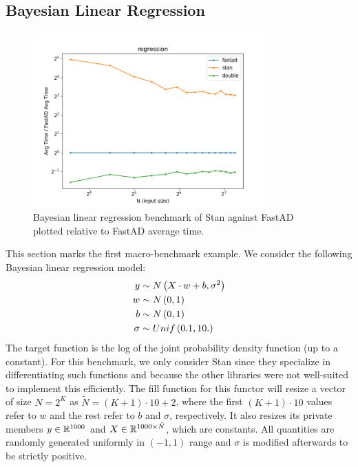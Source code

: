\subsection{Bayesian Linear Regression}\label{ssec:regression}

\begin{figure}[t]
    \centering
    \includegraphics[width=0.8\textwidth]{figs/regression_fig.png}
    \caption{%
        Bayesian linear regression benchmark of Stan against FastAD 
        plotted relative to FastAD average time.
    }\label{fig:regression}
\end{figure}

This section marks the first macro-benchmark example.
We consider the following Bayesian linear regression model:
\begin{align*}
    y &\sim N\left(X\cdot w + b, \sigma^2\right) \\
    w &\sim N\left(0,1\right) \\
    b &\sim N\left(0,1\right) \\
    \sigma &\sim Unif\left(0.1, 10.\right)
\end{align*}
The target function is the log of the joint probability density function (up to a constant).
For this benchmark, we only consider Stan since they specialize in differentiating such functions
and because the other libraries were not well-suited to implement this efficiently.
The fill function for this functor will resize a vector of size $N = 2^K$ as $\tilde{N} = (K + 1) \cdot 10 + 2$,
where the first $(K+1) \cdot 10$ values refer to $w$ and the rest refer to $b$ and $\sigma$, respectively.
It also resizes its private members $y \in \mathbb{R}^{1000}$ and $X \in \mathbb{R}^{1000 \times \tilde{N}}$, which are constants.
All quantities are randomly generated uniformly in $(-1,1)$ range
and $\sigma$ is modified afterwards to be strictly positive.

